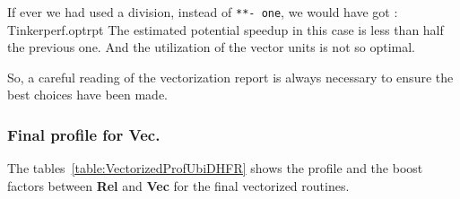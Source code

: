 \documentclass[9pt,comparison]{livecoms}
\newcommand{\lv}{\Large\verb}
\begin{document}
If ever we had used a division, instead of {\color{blue}\lv|**|\color{red}\lv|- one|}, we would have got :
 {Tinkerperf.optrpt}
The estimated potential speedup in this case is less than half the previous one. And the utilization of the vector units is not so optimal.

So, a careful reading of the vectorization report is always necessary to ensure the best choices have been made.
\subsubsection{Final profile for \textbf{Vec}.}
\hspace{\parindent}The tables~\ref{table:VectorizedProfUbiDHFR} shows the profile and the boost factors between \textbf{Rel} and \textbf{Vec} for the final vectorized routines. 
\end{document}
